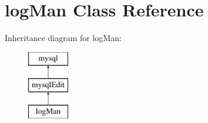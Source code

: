 \hypertarget{classlog_man}{\section{log\-Man Class Reference}
\label{classlog_man}
}
Inheritance diagram for log\-Man\-:\begin{figure}[H]
\begin{center}
\leavevmode
\includegraphics[height=3.000000cm]{classlog_man}
\end{center}
\end{figure}
